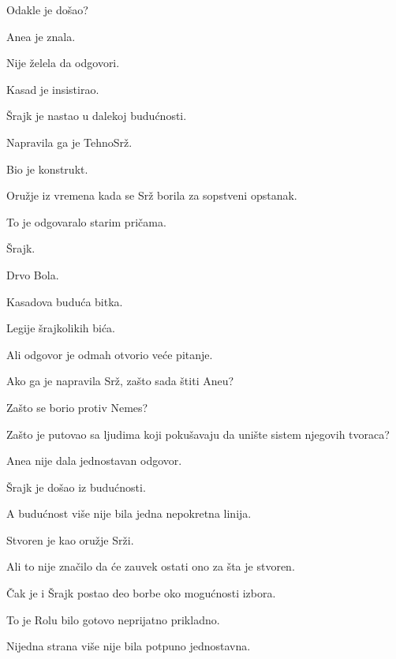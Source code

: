 Odakle je došao?

\bigskip

Anea je znala.

Nije želela da odgovori.

\bigskip

Kasad je insistirao.

\bigskip

Šrajk je nastao u dalekoj budućnosti.

\bigskip

Napravila ga je TehnoSrž.

\bigskip

Bio je konstrukt.

Oružje iz vremena kada se Srž borila za sopstveni opstanak.

\bigskip

To je odgovaralo starim pričama.

Šrajk.

Drvo Bola.

Kasadova buduća bitka.

Legije šrajkolikih bića.

\bigskip

Ali odgovor je odmah otvorio veće pitanje.

\bigskip

Ako ga je napravila Srž, zašto sada štiti Aneu?

\bigskip

Zašto se borio protiv Nemes?

Zašto je putovao sa ljudima koji pokušavaju da unište sistem njegovih tvoraca?

\bigskip

Anea nije dala jednostavan odgovor.

\bigskip

Šrajk je došao iz budućnosti.

A budućnost više nije bila jedna nepokretna linija.

\bigskip

Stvoren je kao oružje Srži.

Ali to nije značilo da će zauvek ostati ono za šta je stvoren.

\bigskip

Čak je i Šrajk postao deo borbe oko mogućnosti izbora.

\bigskip

To je Rolu bilo gotovo neprijatno prikladno.

\bigskip

Nijedna strana više nije bila potpuno jednostavna.

